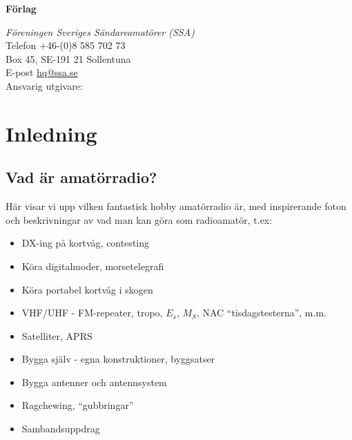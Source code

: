 \documentclass[a4paper,twoside,openright]{book}
\begin{document}

\vfill

\noindent
\textbf{Förlag}

\noindent
\textit{Föreningen Sveriges Sändareamatörer (SSA)}\\
Telefon +46-(0)8 585 702 73\\
Box 45, SE-191 21 Sollentuna\\
E-post \href{mailto:hq@ssa.se}{hq@ssa.se}\\[\baselineskip]

\noindent
Ansvarig utgivare:\\

\cleardoublepage
\pagestyle{fancy}


\tableofcontents

\setlength{\parindent}{0px}
\setlength{\parskip}{1ex plus 0.5ex minus 0.2ex}

\mainmatter

%





\part{Inledning}

\chapter{Vad är amatörradio?}
Här visar vi upp vilken fantastisk hobby amatörradio är, med
inspirerande foton och beskrivningar av vad man kan göra som
radioamatör, t.ex:
\begin{itemize}
\item DX-ing på kortvåg, contesting
\item Köra digitalmoder, morsetelegrafi
\item Köra portabel kortvåg i skogen
\item VHF/UHF - FM-repeater, tropo, $E_s$, $M_S$, NAC ``tisdagstesterna'', m.m.
\item Satelliter, APRS
\item Bygga själv - egna konstruktioner, byggsatser
\item Bygga antenner och antennsystem
\item Ragchewing, ``gubbringar''
\item Sambandsuppdrag
\end{itemize}
\end{document}
